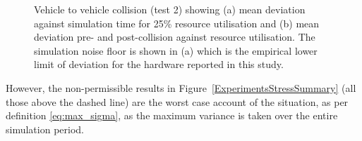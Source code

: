 \documentclass[letterpaper, 10 pt, journal, twoside]{IEEEtran}
\begin{document}
\begin{figure}[h]
\begin{subfigure}{.49\textwidth}
        \caption{}
        \label{CarsCollisionPrePost}
    \end{subfigure}
    \caption{Vehicle to vehicle collision (test 2) showing (a) mean deviation against simulation time for 25\% resource utilisation and (b) mean deviation pre- and post-collision against resource utilisation. The simulation noise floor is shown in (a) which is the empirical lower limit of deviation for the hardware reported in this study.}
\end{figure}



However, the non-permissible results in Figure~\ref{ExperimentsStressSummary} (all those above the dashed line) are the worst case account of the situation, as per definition \ref{eq:max_sigma}, as the maximum variance is taken over the entire simulation period.
\end{document}
